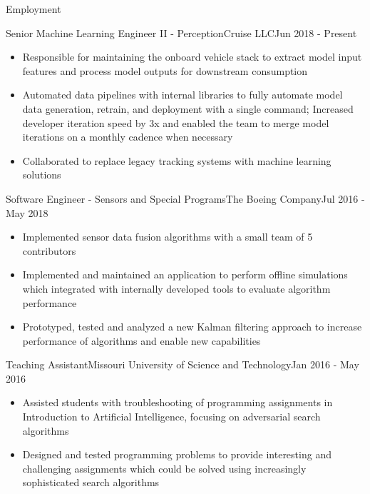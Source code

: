 \documentclass[]{mcdowellcv}
\begin{document}
\begin{cvsection}{Employment}
\begin{cruise}
\begin{cvsubsection}{Senior Machine Learning Engineer II - Perception}{Cruise LLC}{Jun 2018 - Present}
\begin{itemize}
\begin{itemize}
            \end{itemize}
            \item Responsible for maintaining the onboard vehicle stack to extract model input features and process model outputs for downstream consumption
            \item Automated data pipelines with internal libraries to fully automate model data generation, retrain, and deployment with a single command; Increased developer iteration speed by 3x and enabled the team to merge model iterations on a monthly cadence when necessary
            \item Collaborated to replace legacy tracking systems with machine learning solutions 
        \end{itemize}
    \end{cvsubsection}
\end{cruise}

\begin{boeing}
    \begin{cvsubsection}{Software Engineer - Sensors and Special Programs}{The Boeing Company}{Jul 2016 - May 2018}
        \begin{itemize}
            \item Implemented sensor data fusion algorithms with a small team of 5 contributors
            \item Implemented and maintained an application to perform offline simulations which integrated with internally developed tools to evaluate algorithm performance
            \item Prototyped, tested and analyzed a new Kalman filtering approach to increase performance of algorithms and enable new capabilities
        \end{itemize}
    \end{cvsubsection}
\end{boeing}
    
\begin{aigrader}
    \begin{cvsubsection}[2]{Teaching Assistant}{Missouri University of Science and Technology}{Jan 2016 - May 2016}
        \begin{itemize}
            \item Assisted students with troubleshooting of programming assignments in Introduction to Artificial Intelligence, focusing on adversarial search algorithms
            \item Designed and tested programming problems to provide interesting and challenging assignments which could be solved using increasingly sophisticated search algorithms
        \end{itemize}
    \end{cvsubsection}
\end{aigrader}


\end{cvsection}
\end{document}
